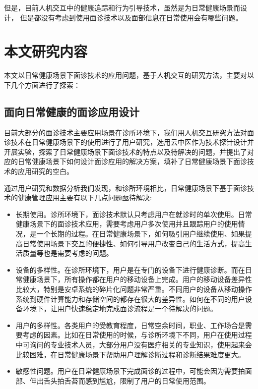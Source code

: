 但是，目前人机交互中的健康追踪和行为引导技术，虽然是为日常健康场景而设计，
但是都没有考虑到使用面诊技术以及面部信息在日常使用会有哪些问题。


\section{本文研究内容}

本文以日常健康场景下面诊技术的应用问题，基于人机交互的研究方法，主要对以下几个方面进行了探索：

\subsection{面向日常健康的面诊应用设计}

目前大部分的面诊技术主要应用场景在诊所环境下，我们用人机交互研究方法对面诊技术在日常健康场景下的使用进行了用户研究，选用云中医作为技术探针设计并开展实验，探索了日常健康场景下面诊技术的特点以及待解决的问题，并提出了对应的日常健康场景下如何设计面诊应用的解决方案，填补了日常健康场景下面诊技术的应用研究的空白\cite{ding2019reading}。

通过用户研究和数据分析我们发现，和诊所环境相比，日常健康场景下基于面诊技术的健康管理应用主要有以下几点问题亟待解决: 

\begin{itemize}
    
    \item 长期使用。诊所环境下，面诊技术默认只考虑用户在就诊时的单次使用。日常健康场景下的面诊技术应用，需要考虑用户多次使用并且跟踪用户的使用情况，是一个长期的过程。在日常健康场景下，如何吸引用户继续使用、如果提高日常使用场景下交互的便捷性、如何引导用户改变自己的生活方式，提高生活质量等也是需要考虑的问题。

    \item 设备的多样性。在诊所环境下，用户是在专门的设备下进行健康诊断。而在日常健康场景下，所有操作都在用户的移动设备上完成。用户的移动设备差异性比较大，特别是安卓系统的碎片化问题非常严重。不同用户的设备从移动操作系统到硬件计算能力和存储空间的都存在很大的差异性。如何在不同的用户设备环境下，让用户快速稳定地完成面诊流程是一个待解决的问题。
    
    \item 用户的多样性。各类用户的受教育程度，日常空余时间，职业、工作场合是需要考虑的因素。比如在日常使用的时候，与诊所环境下不同，用户在使用过程中可询问的专业技术人员，大部分用户没有医疗相关的专业知识，使用起来会比较困难，在日常健康场景下帮助用户理解诊断过程和诊断结果难度更大。
    
    \item 敏感性问题。用户在日常健康场景下完成面诊的过程中，可能会因为需要拍面部、伸出舌头拍舌苔而感到尴尬，限制了用户的日常使用范围。

\end{itemize}

